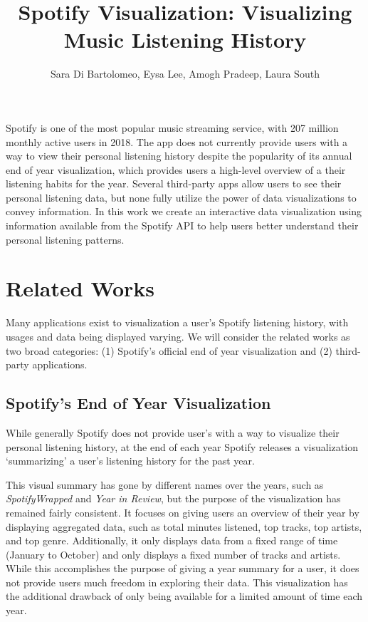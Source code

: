 \documentclass[journal]{vgtc}                %
\title{Spotify Visualization: Visualizing Music Listening History}
\author{Sara Di Bartolomeo, Eysa Lee, Amogh Pradeep, Laura South}
\begin{document}


\maketitle


Spotify is one of the most popular music streaming service, with 207 million monthly active users in 2018. The app does not currently provide users with a way to view their personal listening history despite the popularity of its annual end of year visualization, which provides users a high-level overview of a their listening habits for the year. Several third-party apps allow users to see their personal listening data, but none fully utilize the power of data visualizations to convey information. In this work we create an interactive data visualization using information available from the Spotify API to help users better understand their personal listening patterns.

\section{Related Works}
Many applications exist to visualization a user's Spotify listening history, with usages and data being displayed varying. We will consider the related works as two broad categories: (1) Spotify's official end of year visualization and (2) third-party applications.

\subsection{Spotify's End of Year Visualization}

While generally Spotify does not provide user's with a way to visualize their personal listening history, at the end of each year Spotify releases a visualization `summarizing' a user's listening history for the past year\cite{Spo18}.

This visual summary has gone by different names over the years, such as \emph{SpotifyWrapped} and \emph{Year in Review}, but the purpose of the visualization has remained fairly consistent. It focuses on giving users an overview of their year by displaying aggregated data, such as total minutes listened, top tracks, top artists, and top genre. Additionally, it only displays data from a fixed range of time (January to October) and only displays a fixed number of tracks and artists. While this accomplishes the purpose of giving a year summary for a user, it does not provide users much freedom in exploring their data. This visualization has the additional drawback of only being available for a limited amount of time each year.
\end{document}
